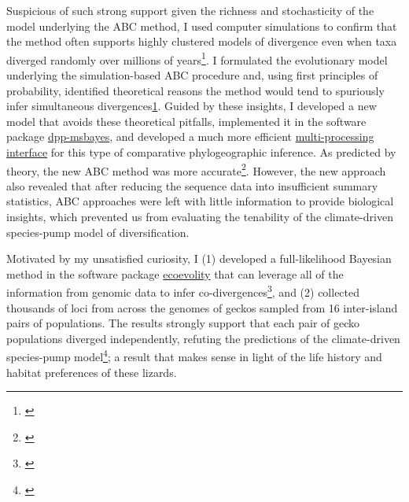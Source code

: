 Suspicious of such strong support given the richness and stochasticity of the
model underlying the ABC method, I used computer simulations to confirm that
the method often supports highly clustered models of divergence even when taxa
diverged randomly over millions of years\footnote{\label{Oaks12}\hspace{-0.8em}}.
I formulated the evolutionary model underlying the simulation-based ABC
procedure and, using first principles of probability, identified theoretical
reasons the method would tend to spuriously infer simultaneous
divergences\cref{Oaks12}.
Guided by these insights, I developed a new model that avoids these theoretical
pitfalls,
implemented it in the software package
\href{https://github.com/joaks1/dpp-msbayes}{dpp-msbayes},
and developed a much more efficient 
\href{https://joaks1.github.io/PyMsBayes/}{multi-processing interface}
for this type of comparative phylogeographic inference.
As predicted by theory, the new ABC method was more
accurate\footnote{\label{Oaks14dpp}\hspace{-0.8em}}.
However, the new approach also revealed that after reducing the sequence data
into insufficient summary statistics, ABC approaches were left with little
information to provide biological insights,
which prevented us from evaluating the tenability of the climate-driven
species-pump model of diversification.

Motivated by my unsatisfied curiosity, I
(1) developed a full-likelihood Bayesian method in the software package
\href{http://phyletica.org/ecoevolity/}{ecoevolity}
that can leverage all of the information from genomic data to infer
co-divergences\footnote{\label{Oaks18ecoevolity}\hspace{-0.8em}},
and
(2) collected thousands of loci from across the genomes of geckos sampled from
16 inter-island pairs of populations.
The results strongly support that each pair of gecko populations diverged
independently, refuting the predictions of the climate-driven species-pump
model\footnote{\label{Oaks18paic}\hspace{-0.8em}};
a result that makes sense in light of the life history and habitat
preferences of these lizards.

